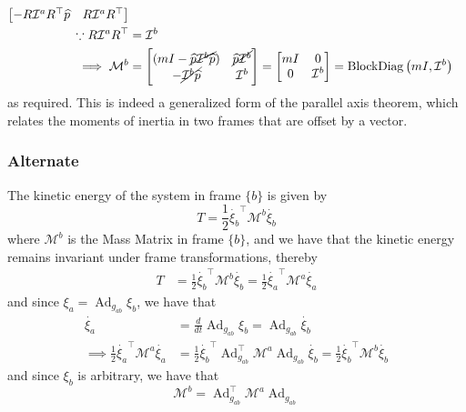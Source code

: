 \begin{align*}
\begin{bmatrix}
        - R\mathcal{I}^{a} R^{\top}\widehat{p}                   & R\mathcal{I}^{a} R^{\top}
    \end{bmatrix}
    \\
    \because
    R\mathcal{I}^{a} R^{\top}
     & =
    \mathcal{I}^{b}
    \\
    \implies
    \mathcal{M}^{b}
     & =
    \begin{bmatrix}
        (mI - \cancel{\widehat{p} \mathcal{I}^{b} \widehat{p}}) & \cancel{\widehat{p} \mathcal{I}^{b}} \\
        - \cancel{\mathcal{I}^{b} \widehat{p}}                  & \mathcal{I}^{b}
    \end{bmatrix}
    =
    \begin{bmatrix}
        mI & 0               \\
        0  & \mathcal{I}^{b}
    \end{bmatrix}
    =
    \operatorname{BlockDiag}\left(m I, \mathcal{I}^{b}\right)
\end{align*}
as required.
This is indeed a generalized form of the parallel axis theorem, which relates the moments of inertia in two frames that are offset by a vector.

\subsubsection*{Alternate}

The kinetic energy of the system in frame \( \{b\} \) is given by
\begin{equation*}
    T
    =
    \frac{1}{2} \dot{\xi_{b}}^{\top} \mathcal{M}^{b} \dot{\xi_{b}}
\end{equation*}
where \( \mathcal{M}^{b} \) is the Mass Matrix in frame \( \{b\} \), and we have that the kinetic energy remains invariant under frame transformations, thereby
\begin{align*}
    T
     & =
    \frac{1}{2} \dot{\xi_{b}}^{\top} \mathcal{M}^{b} \dot{\xi_{b}}
    =
    \frac{1}{2} \dot{\xi_{a}}^{\top} \mathcal{M}^{a} \dot{\xi_{a}}
\end{align*}
and since \( \xi_{a} = \operatorname{Ad}_{g_{a b}} \xi_{b} \), we have that
\begin{align*}
    \dot{\xi_{a}}
     & =
    \frac{d}{dt} \operatorname{Ad}_{g_{a b}} \xi_{b}
    =
    \operatorname{Ad}_{g_{a b}} \dot{\xi_{b}}
    \\
    \implies
    \frac{1}{2} \dot{\xi_{a}}^{\top} \mathcal{M}^{a} \dot{\xi_{a}}
     & =
    \frac{1}{2} \dot{\xi_{b}}^{\top} \operatorname{Ad}_{g_{a b}}^{\top} \mathcal{M}^{a} \operatorname{Ad}_{g_{a b}} \dot{\xi_{b}}
    =
    \frac{1}{2} \dot{\xi_{b}}^{\top} \mathcal{M}^{b} \dot{\xi_{b}}
\end{align*}
and since \( \xi_{b} \) is arbitrary, we have that
\begin{equation*}
    \boxed{
    \mathcal{M}^{b}
    =
    \operatorname{Ad}_{g_{a b}}^{\top} \mathcal{M}^{a} \operatorname{Ad}_{g_{a b}}
    }
\end{equation*}

